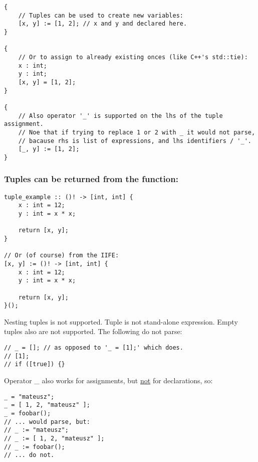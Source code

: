 \documentclass[11pt]{article}
\begin{document}
\begin{verbatim}
{
    // Tuples can be used to create new variables:
    [x, y] := [1, 2]; // x and y and declared here.
}

{
    // Or to assign to already existing onces (like C++'s std::tie):
    x : int;
    y : int;
    [x, y] = [1, 2];
}

{
    // Also operator '_' is supported on the lhs of the tuple assignment.
    // Noe that if trying to replace 1 or 2 with _ it would not parse,
    // bacause rhs is list of expressions, and lhs identifiers / '_'.
    [_, y] := [1, 2];
}
\end{verbatim}

\subsubsection*{Tuples can be returned from the function:}
\label{sec:org1bfa430}
\begin{verbatim}
tuple_example :: ()! -> [int, int] {
    x : int = 12;
    y : int = x * x;

    return [x, y];
}

// Or (of course) from the IIFE:
[x, y] := ()! -> [int, int] {
    x : int = 12;
    y : int = x * x;

    return [x, y];
}();
\end{verbatim}

Nesting tuples is not supported. Tuple is not stand-alone expression. Empty
tuples also are not supported. The following do not parse:
\begin{verbatim}
// _ = []; // as opposed to '_ = [1];' which does.
// [1];
// if ([true]) {}
\end{verbatim}

Operator \_ also works for assignments, but \uline{not} for declarations, so:
\begin{verbatim}
_ = "mateusz";
_ = [ 1, 2, "mateusz" ];
_ = foobar();
// ... would parse, but:
// _ := "mateusz";
// _ := [ 1, 2, "mateusz" ];
// _ := foobar();
// ... do not.
\end{verbatim}
\end{document}
